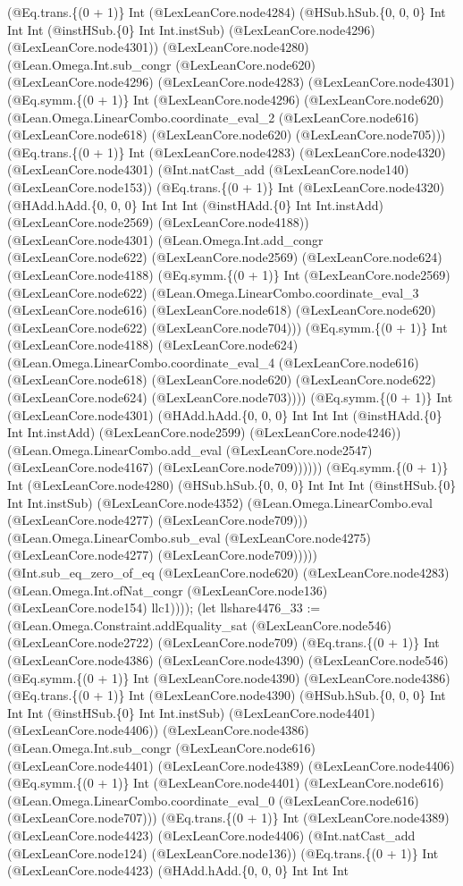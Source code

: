 \documentclass[11pt]{article}
\begin{document}
(@Eq.trans.\{(0 + 1)\} Int (@LexLeanCore.node4284) (@HSub.hSub.\{0, 0, 0\} Int Int Int (@instHSub.\{0\} Int Int.instSub) (@LexLeanCore.node4296) (@LexLeanCore.node4301)) (@LexLeanCore.node4280) (@Lean.Omega.Int.sub\_congr (@LexLeanCore.node620) (@LexLeanCore.node4296) (@LexLeanCore.node4283) (@LexLeanCore.node4301) (@Eq.symm.\{(0 + 1)\} Int (@LexLeanCore.node4296) (@LexLeanCore.node620) (@Lean.Omega.LinearCombo.coordinate\_eval\_2 (@LexLeanCore.node616) (@LexLeanCore.node618) (@LexLeanCore.node620) (@LexLeanCore.node705))) (@Eq.trans.\{(0 + 1)\} Int (@LexLeanCore.node4283) (@LexLeanCore.node4320) (@LexLeanCore.node4301) (@Int.natCast\_add (@LexLeanCore.node140) (@LexLeanCore.node153)) (@Eq.trans.\{(0 + 1)\} Int (@LexLeanCore.node4320) (@HAdd.hAdd.\{0, 0, 0\} Int Int Int (@instHAdd.\{0\} Int Int.instAdd) (@LexLeanCore.node2569) (@LexLeanCore.node4188)) (@LexLeanCore.node4301) (@Lean.Omega.Int.add\_congr (@LexLeanCore.node622) (@LexLeanCore.node2569) (@LexLeanCore.node624) (@LexLeanCore.node4188) (@Eq.symm.\{(0 + 1)\} Int (@LexLeanCore.node2569) (@LexLeanCore.node622) (@Lean.Omega.LinearCombo.coordinate\_eval\_3 (@LexLeanCore.node616) (@LexLeanCore.node618) (@LexLeanCore.node620) (@LexLeanCore.node622) (@LexLeanCore.node704))) (@Eq.symm.\{(0 + 1)\} Int (@LexLeanCore.node4188) (@LexLeanCore.node624) (@Lean.Omega.LinearCombo.coordinate\_eval\_4 (@LexLeanCore.node616) (@LexLeanCore.node618) (@LexLeanCore.node620) (@LexLeanCore.node622) (@LexLeanCore.node624) (@LexLeanCore.node703)))) (@Eq.symm.\{(0 + 1)\} Int (@LexLeanCore.node4301) (@HAdd.hAdd.\{0, 0, 0\} Int Int Int (@instHAdd.\{0\} Int Int.instAdd) (@LexLeanCore.node2599) (@LexLeanCore.node4246)) (@Lean.Omega.LinearCombo.add\_eval (@LexLeanCore.node2547) (@LexLeanCore.node4167) (@LexLeanCore.node709)))))) (@Eq.symm.\{(0 + 1)\} Int (@LexLeanCore.node4280) (@HSub.hSub.\{0, 0, 0\} Int Int Int (@instHSub.\{0\} Int Int.instSub) (@LexLeanCore.node4352) (@Lean.Omega.LinearCombo.eval (@LexLeanCore.node4277) (@LexLeanCore.node709))) (@Lean.Omega.LinearCombo.sub\_eval (@LexLeanCore.node4275) (@LexLeanCore.node4277) (@LexLeanCore.node709))))) (@Int.sub\_eq\_zero\_of\_eq (@LexLeanCore.node620) (@LexLeanCore.node4283) (@Lean.Omega.Int.ofNat\_congr (@LexLeanCore.node136) (@LexLeanCore.node154) llc1)))); (let llshare4476\_33 := (@Lean.Omega.Constraint.addEquality\_sat (@LexLeanCore.node546) (@LexLeanCore.node2722) (@LexLeanCore.node709) (@Eq.trans.\{(0 + 1)\} Int (@LexLeanCore.node4386) (@LexLeanCore.node4390) (@LexLeanCore.node546) (@Eq.symm.\{(0 + 1)\} Int (@LexLeanCore.node4390) (@LexLeanCore.node4386) (@Eq.trans.\{(0 + 1)\} Int (@LexLeanCore.node4390) (@HSub.hSub.\{0, 0, 0\} Int Int Int (@instHSub.\{0\} Int Int.instSub) (@LexLeanCore.node4401) (@LexLeanCore.node4406)) (@LexLeanCore.node4386) (@Lean.Omega.Int.sub\_congr (@LexLeanCore.node616) (@LexLeanCore.node4401) (@LexLeanCore.node4389) (@LexLeanCore.node4406) (@Eq.symm.\{(0 + 1)\} Int (@LexLeanCore.node4401) (@LexLeanCore.node616) (@Lean.Omega.LinearCombo.coordinate\_eval\_0 (@LexLeanCore.node616) (@LexLeanCore.node707))) (@Eq.trans.\{(0 + 1)\} Int (@LexLeanCore.node4389) (@LexLeanCore.node4423) (@LexLeanCore.node4406) (@Int.natCast\_add (@LexLeanCore.node124) (@LexLeanCore.node136)) (@Eq.trans.\{(0 + 1)\} Int (@LexLeanCore.node4423) (@HAdd.hAdd.\{0, 0, 0\} Int Int Int 
\end{document}
